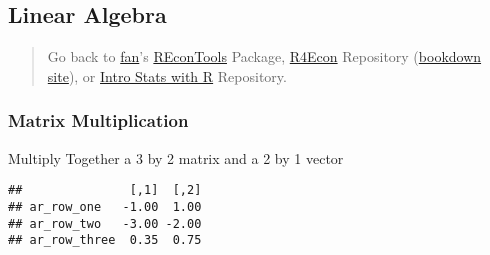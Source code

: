 \documentclass[
]{book}
\newenvironment{Shaded}{\begin{snugshade}}{\end{snugshade}}
\newcommand{\CommentTok}[1]{\textcolor[rgb]{0.56,0.35,0.01}{\textit{#1}}}
\newcommand{\DecValTok}[1]{\textcolor[rgb]{0.00,0.00,0.81}{#1}}
\newcommand{\FloatTok}[1]{\textcolor[rgb]{0.00,0.00,0.81}{#1}}
\newcommand{\KeywordTok}[1]{\textcolor[rgb]{0.13,0.29,0.53}{\textbf{#1}}}
\newcommand{\NormalTok}[1]{#1}
\newcommand{\OperatorTok}[1]{\textcolor[rgb]{0.81,0.36,0.00}{\textbf{#1}}}
\newcommand{\StringTok}[1]{\textcolor[rgb]{0.31,0.60,0.02}{#1}}
\begin{document}
\hypertarget{linear-algebra}{%
\subsection{Linear Algebra}\label{linear-algebra}}

\begin{quote}
Go back to \href{http://fanwangecon.github.io/CodeDynaAsset/}{fan}'s \href{https://fanwangecon.github.io/REconTools/}{REconTools} Package, \href{https://fanwangecon.github.io/R4Econ/}{R4Econ} Repository (\href{https://fanwangecon.github.io/R4Econ/bookdown}{bookdown site}), or \href{https://fanwangecon.github.io/Stat4Econ/}{Intro Stats with R} Repository.
\end{quote}

\hypertarget{matrix-multiplication}{%
\subsubsection{Matrix Multiplication}\label{matrix-multiplication}}

Multiply Together a 3 by 2 matrix and a 2 by 1 vector

\begin{Shaded}
\end{Shaded}

\begin{verbatim}
##               [,1]  [,2]
## ar_row_one   -1.00  1.00
## ar_row_two   -3.00 -2.00
## ar_row_three  0.35  0.75
\end{verbatim}
\end{document}
